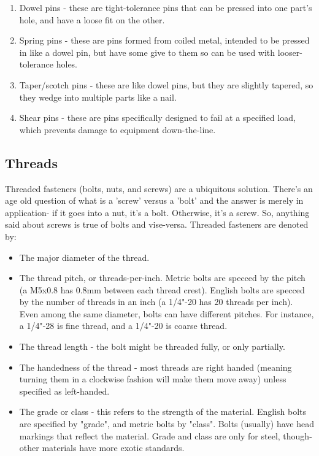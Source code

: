 \documentclass[10pt,letterpaper]{book}
\begin{document}
	\begin{enumerate}[label=\alph*]
		\item Dowel pins - these are tight-tolerance pins that can be pressed into one part's hole, and have a loose fit on the other.
		\item Spring pins - these are pins formed from coiled metal, intended to be pressed in like a dowel pin, but have some give to them so can be used with looser-tolerance holes.
		\item Taper/scotch pins - these are like dowel pins, but they are slightly tapered, so they wedge into multiple parts like a nail.
		\item Shear pins - these are pins specifically designed to fail at a specified load, which prevents damage to equipment down-the-line.
	\end{enumerate}
	
	\subsection{Threads}
	
	Threaded fasteners (bolts, nuts, and screws) are a ubiquitous solution. There's an age old question of what is a 'screw' versus a 'bolt' and the answer is merely in application- if it goes into a nut, it's a bolt. Otherwise, it's a screw. So, anything said about screws is true of bolts and vise-versa. Threaded fasteners are denoted by:
	
	\begin{itemize}
		\item The major diameter of the thread.
		\item The thread pitch, or threads-per-inch. Metric bolts are specced by the pitch (a M5x0.8 has 0.8mm between each thread crest). English bolts are specced by the number of threads in an inch (a 1/4"-20 has 20 threads per inch). Even among the same diameter, bolts can have different pitches. For instance, a 1/4"-28 is fine thread, and a 1/4"-20 is coarse thread.
		\item The thread length - the bolt might be threaded fully, or only partially.
		\item The handedness of the thread - most threads are right handed (meaning turning them in a clockwise fashion will make them move away) unless specified as left-handed.
		\item The grade or class - this refers to the strength of the material. English bolts are specified by "grade", and metric bolts by "class". Bolts (usually) have head markings that reflect the material. Grade and class are only for steel, though- other materials have more exotic standards.
	\end{itemize}
	
\end{document}

